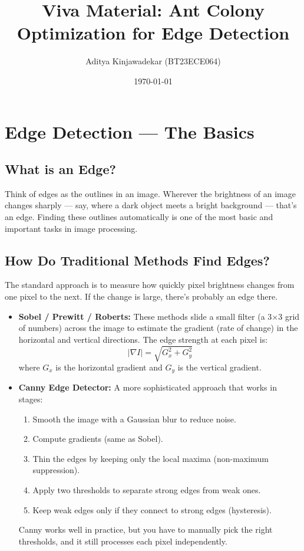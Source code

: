 \documentclass[12pt,a4paper]{article}
\title{\textbf{Viva Material: Ant Colony Optimization for Edge Detection}}
\author{Aditya Kinjawadekar (BT23ECE064)}
\date{\today}
\begin{document}
\maketitle
\tableofcontents
\newpage

\section{Edge Detection --- The Basics}

\subsection{What is an Edge?}
Think of edges as the outlines in an image. Wherever the brightness of an image changes sharply --- say, where a dark object meets a bright background --- that's an edge. Finding these outlines automatically is one of the most basic and important tasks in image processing.

\subsection{How Do Traditional Methods Find Edges?}
The standard approach is to measure how quickly pixel brightness changes from one pixel to the next. If the change is large, there's probably an edge there.

\begin{itemize}
    \item \textbf{Sobel / Prewitt / Roberts:} These methods slide a small filter (a 3$\times$3 grid of numbers) across the image to estimate the gradient (rate of change) in the horizontal and vertical directions. The edge strength at each pixel is:
    \begin{equation}
        |\nabla I| = \sqrt{G_x^2 + G_y^2}
    \end{equation}
    where $G_x$ is the horizontal gradient and $G_y$ is the vertical gradient.

    \item \textbf{Canny Edge Detector:} A more sophisticated approach that works in stages:
    \begin{enumerate}
        \item Smooth the image with a Gaussian blur to reduce noise.
        \item Compute gradients (same as Sobel).
        \item Thin the edges by keeping only the local maxima (non-maximum suppression).
        \item Apply two thresholds to separate strong edges from weak ones.
        \item Keep weak edges only if they connect to strong edges (hysteresis).
    \end{enumerate}
    Canny works well in practice, but you have to manually pick the right thresholds, and it still processes each pixel independently.
\end{itemize}
\end{document}
